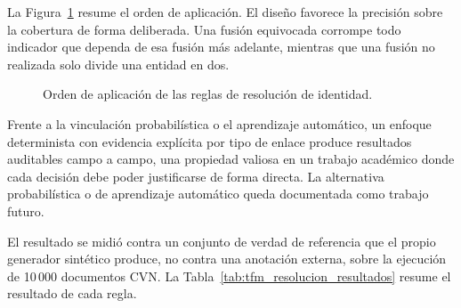 La Figura~\ref{fig:tfm_resolucion_flujo} resume el orden de aplicación. El
diseño favorece la precisión sobre la cobertura de forma deliberada. Una
fusión equivocada corrompe todo indicador que dependa de esa fusión más
adelante, mientras que una fusión no realizada solo divide una entidad en
dos.

\begin{figure}[H]
  \centering
  \caption{Orden de aplicación de las reglas de resolución de identidad.}
  \label{fig:tfm_resolucion_flujo}
\end{figure}

Frente a la vinculación probabilística o el aprendizaje automático, un
enfoque determinista con evidencia explícita por tipo de enlace produce
resultados auditables campo a campo, una propiedad valiosa en un trabajo
académico donde cada decisión debe poder justificarse de forma directa. La
alternativa probabilística o de aprendizaje automático queda documentada
como trabajo futuro.

El resultado se midió contra un conjunto de verdad de referencia que el
propio generador sintético produce, no contra una anotación externa, sobre
la ejecución de 10\,000 documentos CVN. La Tabla~\ref{tab:tfm_resolucion_resultados}
resume el resultado de cada regla.

